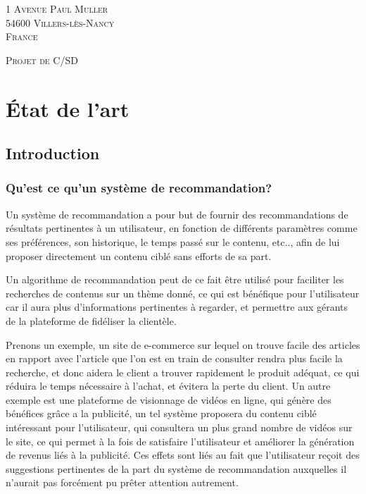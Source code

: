 \documentclass[11pt,a4paper]{report}
\begin{document}
\begin{titlepage}
\begin{flushright}
        {\scshape
        1 Avenue Paul Muller\\
        54600 Villers-lès-Nancy\\
        France}
        \end{flushright}
        \vspace*{-1cm}
        \begin{flushleft}
        {\scshape Projet de C/SD}
        \end{flushleft}
\end{titlepage}

\newpage
\tableofcontents
\chapter{État de l'art}
\section{Introduction}
\subsection{Qu'est ce qu'un système de recommandation?}
Un système de recommandation a pour but de fournir des recommandations de résultats pertinentes à un utilisateur, en fonction de différents paramètres comme ses préférences, son historique, le temps passé sur le contenu, etc.., afin de lui proposer directement un contenu ciblé sans efforts de sa part.

Un algorithme de recommandation peut de ce fait être utilisé pour faciliter les recherches de contenus sur un thème donné, ce qui est bénéfique pour l'utilisateur car il aura plus d'informations pertinentes à regarder, et permettre aux gérants de la plateforme de fidéliser la clientèle.\par

Prenons un exemple, un site de e-commerce sur lequel on trouve facile des articles en rapport avec l'article que l'on est en train de consulter rendra plus facile la recherche, et donc aidera le client a trouver rapidement le produit adéquat, ce qui réduira le temps nécessaire à l'achat, et évitera la perte du client.
Un autre exemple est une plateforme de visionnage de vidéos en ligne, qui génère des bénéfices grâce a la publicité, un tel système proposera du contenu ciblé intéressant pour l'utilisateur, qui consultera un plus grand nombre de vidéos sur le site, ce qui permet à la fois de satisfaire l'utilisateur et améliorer la génération de revenus liés à la publicité.
Ces effets sont liés au fait que l'utilisateur reçoit des suggestions pertinentes de la part du système de recommandation auxquelles il n'aurait pas forcément pu prêter attention autrement.\par
\end{document}
